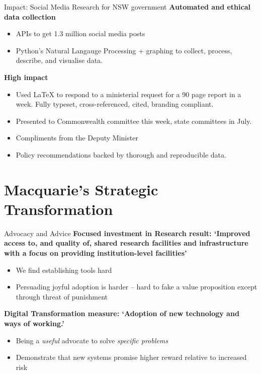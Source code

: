 \documentclass[aspectratio=1610, 11pt]{beamer} %
\begin{document}
\begin{frame}{Impact: Social Media Research for NSW government}
\textbf{Automated and ethical data collection}
\begin{itemize}
    \item APIs to get 1.3 million social media posts
    \item Python's Natural Langauge Processing + graphing to collect, process, describe, and visualise data.
\end{itemize}
\textbf{High impact}
\begin{itemize}
    \item Used \LaTeX{} to respond to a ministerial request for a 90 page report in a week. Fully typeset, cross-referenced, cited, branding compliant.
    \item Presented to Commonwealth committee this week, state committees in July.
    \item Compliments from the Deputy Minister
    \item Policy recommendations backed by thorough and reproducible data. 
\end{itemize}
\end{frame}


\section{Macquarie's Strategic Transformation}

\begin{frame}{Advocacy and Advice}
\textbf{Focused investment in Research result: `Improved access to, and quality of, shared research facilities and infrastructure with a focus on providing institution-level facilities'}

\begin{itemize}
    \item We find establishing tools hard
    \item Persuading joyful adoption is harder -- hard to fake a value proposition except through threat of punishment
\end{itemize}

\textbf{Digital Transformation measure: `Adoption of new technology and ways of working.'}
\begin{itemize}
    \item Being a \textit{useful} advocate to solve \textit{specific problems}
    \item Demonstrate that new systems promise higher reward relative to increased risk
\end{itemize}
\end{frame}
\end{document}
